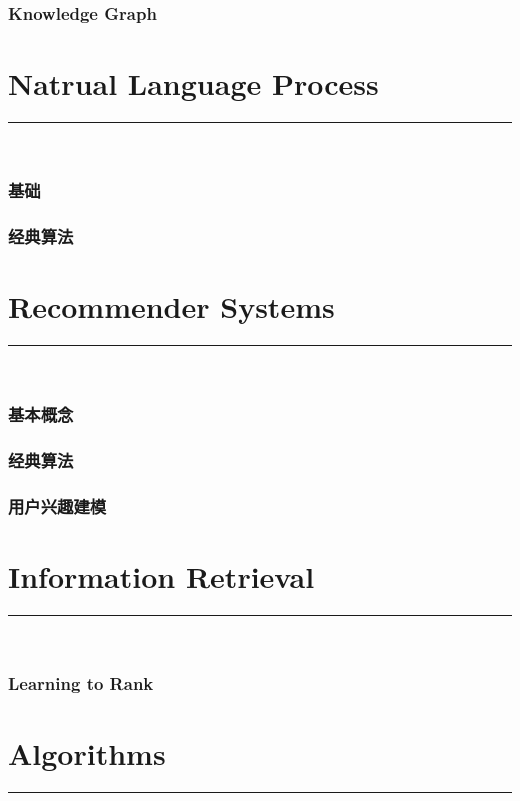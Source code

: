 \documentclass{article}
\begin{document}
\section{Knowledge Graph}



\clearpage
\part{Natrual Language Process}
{\noindent}	 \rule[-10pt]{17.5cm}{0.5em}\\
\section{基础}


\section{经典算法}



\clearpage
\part{Recommender Systems}
{\noindent}	 \rule[-10pt]{17.5cm}{0.5em}\\
\section{基本概念}


\section{经典算法}


\section{用户兴趣建模}



\clearpage
\part{Information Retrieval}
{\noindent}	 \rule[-10pt]{17.5cm}{0.5em}\\
\section{Learning to Rank}



\clearpage
\part{Algorithms}
{\noindent}	 \rule[-10pt]{17.5cm}{0.5em}\\
\end{document}
